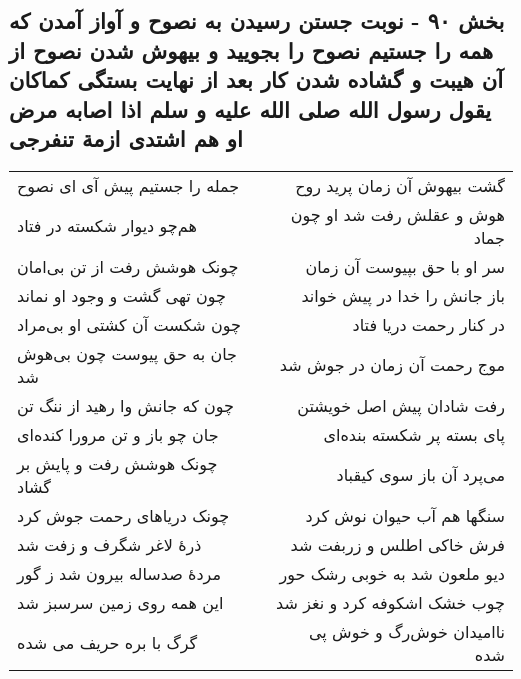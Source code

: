 \begin{center}
\section*{بخش ۹۰ - نوبت جستن رسیدن به نصوح و آواز آمدن که همه را جستیم نصوح را بجویید و بیهوش شدن نصوح از آن هیبت و گشاده شدن کار بعد از نهایت بستگی کماکان یقول رسول الله صلی الله علیه و سلم اذا اصابه مرض او هم اشتدی ازمة تنفرجی}
\label{sec:sh090}
\begin{longtable}{l p{0.5cm} r}
جمله را جستیم پیش آی ای نصوح
&&
گشت بیهوش آن زمان پرید روح
\\
هم‌چو دیوار شکسته در فتاد
&&
هوش و عقلش رفت شد او چون جماد
\\
چونک هوشش رفت از تن بی‌امان
&&
سر او با حق بپیوست آن زمان
\\
چون تهی گشت و وجود او نماند
&&
باز جانش را خدا در پیش خواند
\\
چون شکست آن کشتی او بی‌مراد
&&
در کنار رحمت دریا فتاد
\\
جان به حق پیوست چون بی‌هوش شد
&&
موج رحمت آن زمان در جوش شد
\\
چون که جانش وا رهید از ننگ تن
&&
رفت شادان پیش اصل خویشتن
\\
جان چو باز و تن مرورا کنده‌ای
&&
پای بسته پر شکسته بنده‌ای
\\
چونک هوشش رفت و پایش بر گشاد
&&
می‌پرد آن باز سوی کیقباد
\\
چونک دریاهای رحمت جوش کرد
&&
سنگها هم آب حیوان نوش کرد
\\
ذرهٔ لاغر شگرف و زفت شد
&&
فرش خاکی اطلس و زربفت شد
\\
مردهٔ صدساله بیرون شد ز گور
&&
دیو ملعون شد به خوبی رشک حور
\\
این همه روی زمین سرسبز شد
&&
چوب خشک اشکوفه کرد و نغز شد
\\
گرگ با بره حریف می شده
&&
ناامیدان خوش‌رگ و خوش پی شده
\\
\end{longtable}
\end{center}
